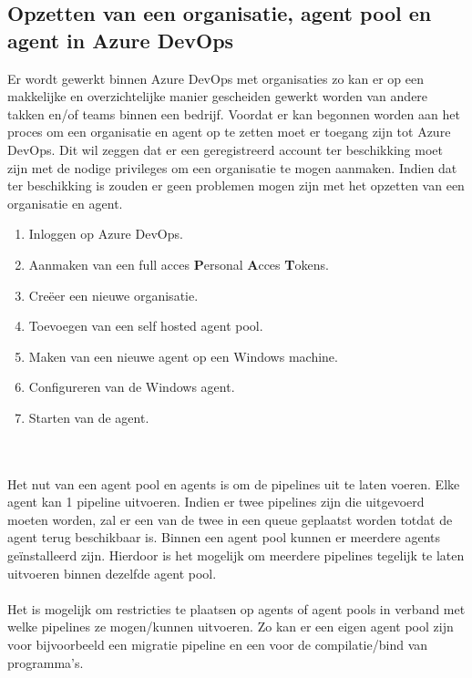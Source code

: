 \subsection{Opzetten van een organisatie, agent pool en agent in Azure DevOps}
Er wordt gewerkt binnen Azure DevOps met organisaties zo kan er op een makkelijke en overzichtelijke manier gescheiden gewerkt worden van andere takken en/of teams binnen een bedrijf. Voordat er kan begonnen worden aan het proces om een organisatie en agent op te zetten moet er toegang zijn tot Azure DevOps. Dit wil zeggen dat er een geregistreerd account ter beschikking moet zijn met de nodige privileges om een organisatie te mogen aanmaken. Indien dat ter beschikking is zouden er geen problemen mogen zijn met het opzetten van een organisatie en agent. 
\begin{enumerate}
    \item Inloggen op Azure DevOps.
    \item Aanmaken van een full acces \textbf{P}ersonal \textbf{A}cces \textbf{T}okens.
    \item Creëer een nieuwe organisatie.
    \item Toevoegen van een self hosted agent pool.
    \item Maken van een nieuwe agent op een Windows machine.
    \item Configureren van de Windows agent.
    \item Starten van de agent. 
\end{enumerate}
\autocite{Microsoft2024a}
\autocite{Microsoft2024b}
\autocite{Microsoft2024c}
\\ \\
Het nut van een agent pool en agents is om de pipelines uit te laten voeren. Elke agent kan 1 pipeline uitvoeren. Indien er twee pipelines zijn die uitgevoerd moeten worden, zal er een van de twee in een queue geplaatst worden totdat de agent terug beschikbaar is. Binnen een agent pool kunnen er meerdere agents geïnstalleerd zijn. Hierdoor is het mogelijk om meerdere pipelines tegelijk te laten uitvoeren binnen dezelfde agent pool. 
\\ \\
Het is mogelijk om restricties te plaatsen op agents of agent pools in verband met welke pipelines ze mogen/kunnen uitvoeren. Zo kan er een eigen agent pool zijn voor bijvoorbeeld een migratie pipeline en een voor de compilatie/bind van programma's. 

